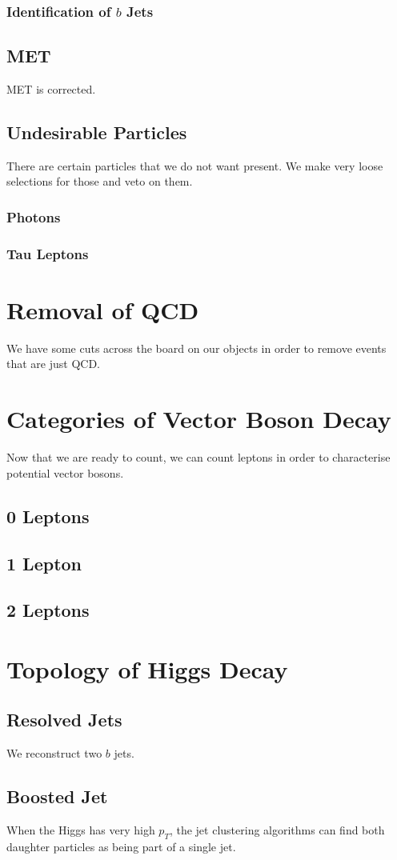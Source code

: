 \subsubsection{Identification of $b$ Jets}

\subsection{MET}

MET is corrected.

\subsection{Undesirable Particles}

There are certain particles that we do not want present.
We make very loose selections for those and veto on them.

\subsubsection{Photons}

\subsubsection{Tau Leptons}

\section{Removal of QCD}

We have some cuts across the board on our objects
in order to remove events that are just QCD.

\section{Categories of Vector Boson Decay}

Now that we are ready to count,
we can count leptons in order to characterise
potential vector bosons.

\subsection{0 Leptons}

\subsection{1 Lepton}

\subsection{2 Leptons}

\section{Topology of Higgs Decay}

\subsection{Resolved Jets}

We reconstruct two $b$ jets.

\subsection{Boosted Jet}

When the Higgs has very high $p_T$,
the jet clustering algorithms can find both daughter particles
as being part of a single jet.

